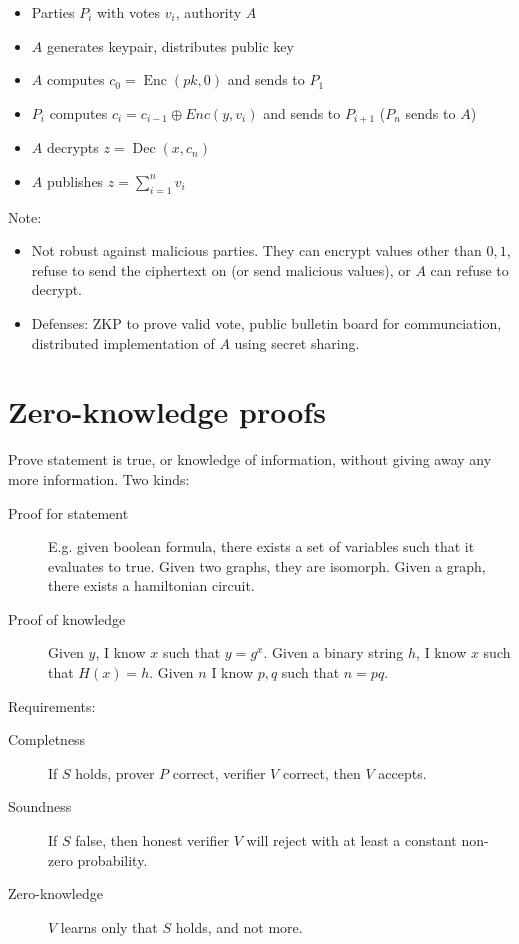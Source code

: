 \begin{itemize}
		\item Parties $P_i$ with votes $v_i$, authority $A$
		\item $A$ generates keypair, distributes public key
		\item $A$ computes $c_0 = \operatorname{Enc}(pk, 0)$ and sends to $P_1$
		\item $P_i$ computes $c_i = c_{i-1} \oplus Enc(y, v_i)$ and sends to
				$P_{i+1}$ ($P_n$ sends to $A$)
		\item $A$ decrypts $z = \operatorname{Dec}(x, c_n)$
		\item $A$ publishes $z = \sum_{i = 1}^n v_i$
\end{itemize}

Note:
\begin{itemize}
		\item Not robust against malicious parties. They can encrypt values
				other than $0, 1$, refuse to send the ciphertext on (or send
				malicious values), or $A$ can refuse to decrypt.
		\item Defenses: ZKP to prove valid vote, public bulletin board for
				communciation, distributed implementation of $A$ using secret
				sharing.
\end{itemize}

\section{Zero-knowledge proofs}

Prove statement is true, or knowledge of information, without giving away any
more information. Two kinds:

\begin{description}
		\item[Proof for statement] E.g. given boolean formula, there exists a
				set of variables such that it evaluates to true. Given two
				graphs, they are isomorph. Given a graph, there exists a
				hamiltonian circuit.
		\item[Proof of knowledge] Given $y$, I know $x$ such that $y = g^x$.
				Given a binary string $h$, I know $x$ such that $H(x) = h$.
				Given $n$ I know $p, q$ such that $n = pq$.
\end{description}

Requirements:
\begin{description}
		\item[Completness] If $S$ holds, prover $P$ correct, verifier $V$
				correct, then $V$ accepts.
		\item[Soundness] If $S$ false, then honest verifier $V$ will reject
				with at least a constant non-zero probability.
		\item[Zero-knowledge] $V$ learns only that $S$ holds, and not more.
\end{description}


